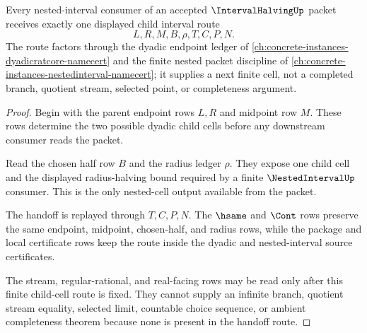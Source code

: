 \begin{theorem}
\label{thm:interval-halving-dyadic-nested-handoff}
Every nested-interval consumer of an accepted $\IntervalHalvingUp$ packet receives exactly one displayed child interval route
$$
L,R,M,B,\rho,T,C,P,N.
$$
The route factors through the dyadic endpoint ledger of \autoref{ch:concrete-instances-dyadicratcore-namecert} and the finite nested packet discipline of \autoref{ch:concrete-instances-nestedinterval-namecert}; it supplies a next finite cell, not a completed branch, quotient stream, selected point, or completeness argument.
\end{theorem}
\begin{proof}
Begin with the parent endpoint rows $L,R$ and midpoint row $M$. These rows determine the two possible dyadic child cells before any downstream consumer reads the packet.

Read the chosen half row $B$ and the radius ledger $\rho$. They expose one child cell and the displayed radius-halving bound required by a finite $\NestedIntervalUp$ consumer. This is the only nested-cell output available from the packet.

The handoff is replayed through $T,C,P,N$. The $\hsame$ and $\Cont$ rows preserve the same endpoint, midpoint, chosen-half, and radius rows, while the package and local certificate rows keep the route inside the dyadic and nested-interval source certificates.

The stream, regular-rational, and real-facing rows may be read only after this finite child-cell route is fixed. They cannot supply an infinite branch, quotient stream equality, selected limit, countable choice sequence, or ambient completeness theorem because none is present in the handoff route.
\end{proof}

